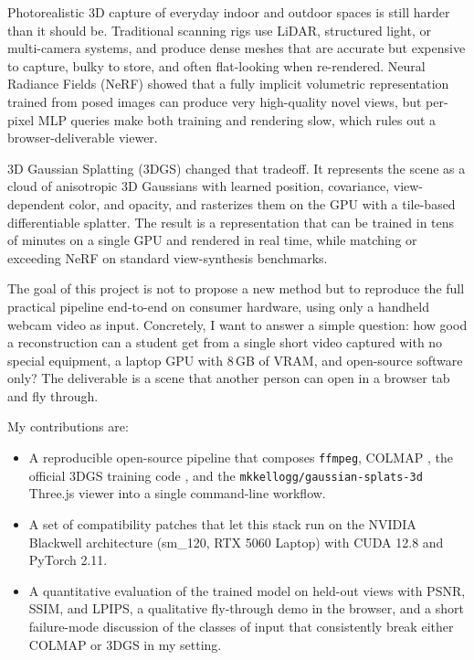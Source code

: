 \documentclass[conference]{IEEEtran}
\begin{document}
Photorealistic 3D capture of everyday indoor and outdoor spaces is still harder than it should be. Traditional scanning rigs use LiDAR, structured light, or multi-camera systems, and produce dense meshes that are accurate but expensive to capture, bulky to store, and often flat-looking when re-rendered. Neural Radiance Fields (NeRF) \cite{mildenhall2020nerf} showed that a fully implicit volumetric representation trained from posed images can produce very high-quality novel views, but per-pixel MLP queries make both training and rendering slow, which rules out a browser-deliverable viewer.

3D Gaussian Splatting (3DGS) \cite{kerbl20233dgs} changed that tradeoff. It represents the scene as a cloud of anisotropic 3D Gaussians with learned position, covariance, view-dependent color, and opacity, and rasterizes them on the GPU with a tile-based differentiable splatter. The result is a representation that can be trained in tens of minutes on a single GPU and rendered in real time, while matching or exceeding NeRF on standard view-synthesis benchmarks.

The goal of this project is not to propose a new method but to reproduce the full practical pipeline end-to-end on consumer hardware, using only a handheld webcam video as input. Concretely, I want to answer a simple question: how good a reconstruction can a student get from a single short video captured with no special equipment, a laptop GPU with 8\,GB of VRAM, and open-source software only? The deliverable is a scene that another person can open in a browser tab and fly through.

My contributions are:
\begin{itemize}
  \item A reproducible open-source pipeline that composes \texttt{ffmpeg}, COLMAP \cite{schonberger2016sfm}, the official 3DGS training code \cite{kerbl20233dgs}, and the \texttt{mkkellogg/gaussian-splats-3d} Three.js viewer into a single command-line workflow.
  \item A set of compatibility patches that let this stack run on the NVIDIA Blackwell architecture (sm\_120, RTX 5060 Laptop) with CUDA 12.8 and PyTorch 2.11.
  \item A quantitative evaluation of the trained model on held-out views with PSNR, SSIM, and LPIPS, a qualitative fly-through demo in the browser, and a short failure-mode discussion of the classes of input that consistently break either COLMAP or 3DGS in my setting.
\end{itemize}
\end{document}
